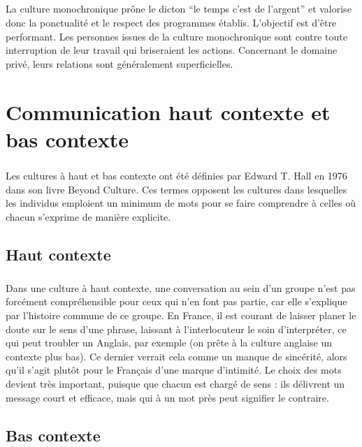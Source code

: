 \paragraph{} La culture monochronique prône le dicton ``le temps c'est de
l'argent'' et valorise donc la ponctualité et le respect des programmes
établis. L'objectif est d'être performant. Les personnes issues de la culture
monochronique sont contre toute interruption de leur travail qui briseraient
les actions. Concernant le domaine privé, leurs relations sont généralement
superficielles.

\chapter[Haut contexte, bas contexte]{Communication haut contexte et bas contexte}

\paragraph{} Les cultures à haut et bas contexte ont été définies par Edward T.
Hall en 1976 dans son livre Beyond Culture. Ces termes opposent les cultures
dans lesquelles les individus emploient un minimum de mots pour se faire
comprendre à celles où chacun s'exprime de manière explicite.

\section{Haut contexte}

\paragraph{} Dans une culture à haut contexte, une conversation au sein d'un
groupe n'est pas forcément compréhensible pour ceux qui n'en font pas partie,
car elle s'explique par l'histoire commune de ce groupe. En France, il est
courant de laisser planer le doute sur le sens d'une phrase, laissant à
l'interlocuteur le soin d'interpréter, ce qui peut troubler un Anglais, par
exemple (on prête à la culture anglaise un contexte plus bas). Ce dernier
verrait cela comme un manque de sincérité, alors qu'il s'agit plutôt pour le
Français d'une marque d'intimité. Le choix des mots devient très important,
puisque que chacun est chargé de sens : ils délivrent un message court et
efficace, mais qui à un mot près peut signifier le contraire.

\section{Bas contexte}

